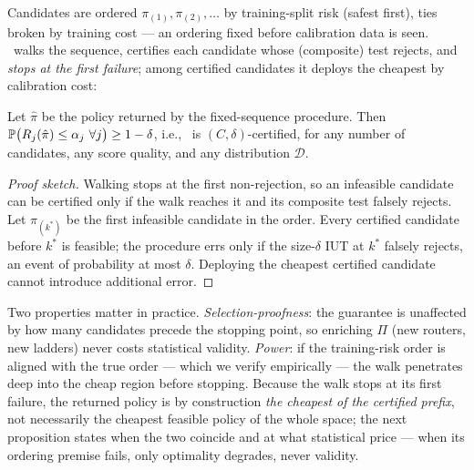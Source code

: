 Candidates are ordered $\pi_{(1)}, \pi_{(2)}, \dots$ by training-split risk
(safest first), ties broken by training cost --- an ordering fixed before
calibration data is seen. \system\ walks the sequence, certifies each
candidate whose (composite) test rejects, and \emph{stops at the first
failure}; among certified candidates it deploys the cheapest by calibration
cost:

\begin{theorem}
\label{thm:validity}
Let $\hat\pi$ be the policy returned by the fixed-sequence procedure. Then
$\mathbb{P}\big(R_j(\hat\pi) \le \alpha_j \ \forall j\big) \ge 1-\delta$,
i.e., \system\ is $(C,\delta)$-certified, for any number of candidates,
any score quality, and any distribution $\mathcal{D}$.
\end{theorem}

\begin{proof}[Proof sketch]
Walking stops at the first non-rejection, so an infeasible candidate can be
certified only if the walk reaches it and its composite test falsely
rejects. Let $\pi_{(k^*)}$ be the first infeasible candidate in the order.
Every certified candidate before $k^*$ is feasible; the procedure errs only
if the size-$\delta$ IUT at $k^*$ falsely rejects, an event of probability
at most $\delta$. Deploying the cheapest certified candidate cannot
introduce additional error. \end{proof}

Two properties matter in practice. \emph{Selection-proofness}: the
guarantee is unaffected by how many candidates precede the stopping point,
so enriching $\Pi$ (new routers, new ladders) never costs statistical
validity. \emph{Power}: if the training-risk order is aligned with the true
order --- which we verify empirically --- the walk penetrates deep into the
cheap region before stopping. Because the walk stops at its first
failure, the returned policy is by construction \emph{the cheapest of
the certified prefix}, not necessarily the cheapest feasible policy of
the whole space; the next proposition states when the two coincide and
at what statistical price --- when its ordering premise fails, only
optimality degrades, never validity.

